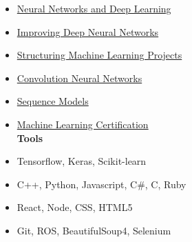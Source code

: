 \smallskip
{}
\smallskip
\begin{itemize}
\item \href{https://www.coursera.org/account/accomplishments/verify/2S594YMXKLEU
}{Neural Networks and Deep Learning}
\item \href{https://www.coursera.org/account/accomplishments/verify/TE2RHVAWCJJ9
}{Improving Deep Neural Networks}
\item \href{https://www.coursera.org/account/accomplishments/verify/NK4BZJWF7VYC
}{Structuring Machine Learning Projects}
\item \href{https://www.coursera.org/account/accomplishments/verify/4ZGHXMVWWMWR
}{Convolution Neural Networks}
\item \href{https://www.coursera.org/account/accomplishments/verify/WL3NVWZ3VMMV
}{Sequence Models}
\end{itemize}
\divider
{}
\smallskip
\begin{itemize}
\item \href{https://www.coursera.org/account/accomplishments/verify/9T3TX33G5TNR
}{Machine Learning Certification}
\smallskip\smallskip \\
\textbf{Tools}
\item Tensorflow, Keras, Scikit-learn
\end{itemize}
\divider
{}
\smallskip
\begin{itemize}
\item C++, Python, Javascript, C\#, C, Ruby
\end{itemize}
\divider
{}
\smallskip
\begin{itemize}
\item React, Node, CSS, HTML5
\end{itemize}
\divider
{}
\smallskip
\begin{itemize}
\item Git, ROS, BeautifulSoup4, Selenium
\end{itemize}
\divider


\smallskip\smallskip\smallskip\bigskip\bigskip\bigskip\bigskip\bigskip \bigskip\bigskip\bigskip \bigskip\bigskip\bigskip 








